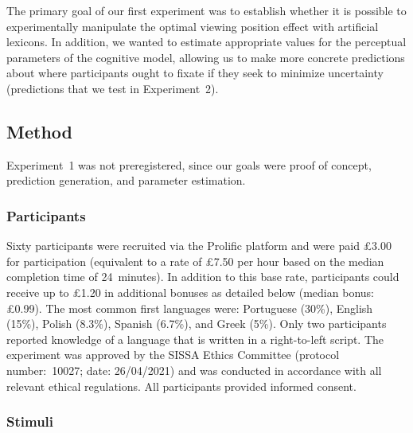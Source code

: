 \documentclass[doc,biblatex]{apa7}
\begin{document}
The primary goal of our first experiment was to establish whether it is possible to experimentally manipulate the optimal viewing position effect with artificial lexicons. In addition, we wanted to estimate appropriate values for the perceptual parameters of the cognitive model, allowing us to make more concrete predictions about where participants ought to fixate if they seek to minimize uncertainty (predictions that we test in Experiment~2).

\subsection{Method}

Experiment~1 was not preregistered, since our goals were proof of concept, prediction generation, and parameter estimation.

\subsubsection{Participants}

Sixty participants were recruited via the Prolific platform and were paid £3.00 for participation (equivalent to a rate of £7.50 per hour based on the median completion time of 24~minutes). In addition to this base rate, participants could receive up to £1.20 in additional bonuses as detailed below (median bonus: £0.99). The most common first languages were: Portuguese (30\%), English (15\%), Polish (8.3\%), Spanish (6.7\%), and Greek (5\%). Only two participants reported knowledge of a language that is written in a right-to-left script. The experiment was approved by the SISSA Ethics Committee (protocol number:~10027; date: 26/04/2021) and was conducted in accordance with all relevant ethical regulations. All participants provided informed consent.

\subsubsection{Stimuli}
\end{document}
